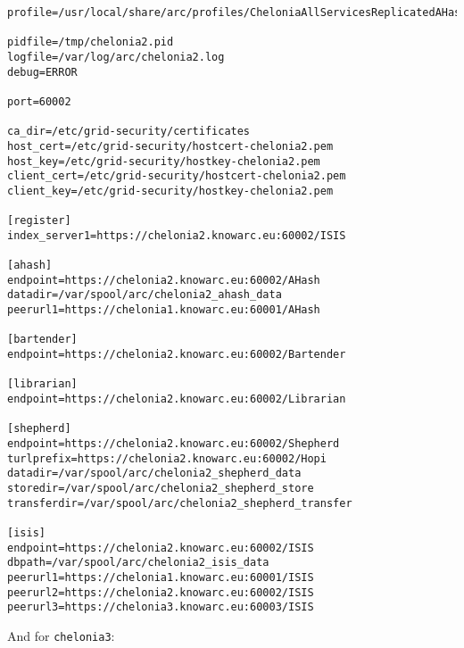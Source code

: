 \documentclass{article}
\begin{document}
\begin{verbatim}
profile=/usr/local/share/arc/profiles/CheloniaAllServicesReplicatedAHashWithISIS.xml

pidfile=/tmp/chelonia2.pid
logfile=/var/log/arc/chelonia2.log
debug=ERROR

port=60002

ca_dir=/etc/grid-security/certificates
host_cert=/etc/grid-security/hostcert-chelonia2.pem
host_key=/etc/grid-security/hostkey-chelonia2.pem
client_cert=/etc/grid-security/hostcert-chelonia2.pem
client_key=/etc/grid-security/hostkey-chelonia2.pem

[register]
index_server1=https://chelonia2.knowarc.eu:60002/ISIS

[ahash]
endpoint=https://chelonia2.knowarc.eu:60002/AHash
datadir=/var/spool/arc/chelonia2_ahash_data
peerurl1=https://chelonia1.knowarc.eu:60001/AHash

[bartender]
endpoint=https://chelonia2.knowarc.eu:60002/Bartender

[librarian]
endpoint=https://chelonia2.knowarc.eu:60002/Librarian

[shepherd]
endpoint=https://chelonia2.knowarc.eu:60002/Shepherd
turlprefix=https://chelonia2.knowarc.eu:60002/Hopi
datadir=/var/spool/arc/chelonia2_shepherd_data
storedir=/var/spool/arc/chelonia2_shepherd_store
transferdir=/var/spool/arc/chelonia2_shepherd_transfer

[isis]
endpoint=https://chelonia2.knowarc.eu:60002/ISIS
dbpath=/var/spool/arc/chelonia2_isis_data
peerurl1=https://chelonia1.knowarc.eu:60001/ISIS
peerurl2=https://chelonia2.knowarc.eu:60002/ISIS
peerurl3=https://chelonia3.knowarc.eu:60003/ISIS
\end{verbatim}

And for \verb!chelonia3!:
\end{document}
